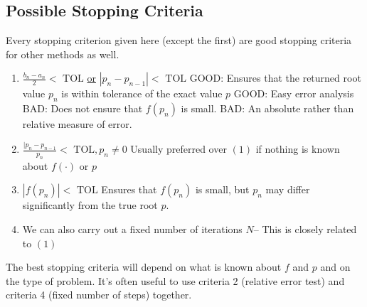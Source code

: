 \subsection{Possible Stopping Criteria}

\tiny Every stopping criterion given here (except the first) are good stopping
criteria for other methods as well.
\normalsize
\begin{enumerate}
  \item $\displaystyle \frac{b_n-a_n}{2} < \text{ TOL}$ \quad\uline{or} \quad
    $\displaystyle \left| p_n - p_{n-1} \right| < \text{ TOL}$
    \subitem GOOD: Ensures that the returned root value $p_n$ is within 
    tolerance of the exact value $p$
    \subitem GOOD: Easy error analysis
    \subitem BAD: Does not ensure that $f(p_n)$ is small.
    \subitem BAD: An absolute rather than relative measure of error.
  \item $\displaystyle \frac{|p_n - p_{n-1}}{p_n} < \text{ TOL}, p_n \neq 0$
    \subitem Usually preferred over $(1)$ if nothing is known about $f(\cdot)$ or
    $p$
  \item $\left| f(p_n) \right| < \text{ TOL}$
    \subitem Ensures that $f(p_n)$ is small, but $p_n$ may differ significantly
    from the true root $p$.
  \item We can also carry out a fixed number of iterations $N$-- This is closely
    related to $(1)$
\end{enumerate}

The best stopping criteria will depend on what is known about $f$ and $p$ and
on the type of problem. It's often useful to use criteria 2 (relative error test)
and criteria 4 (fixed number of steps) together.

